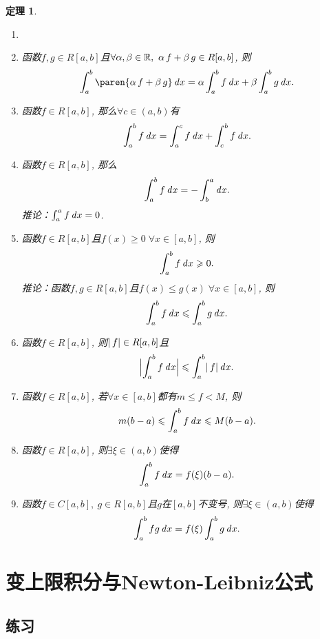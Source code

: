 \documentclass[a4paper,punct=CCT]{ctexbook}
\theoremstyle{break}
\newtheorem*{theorem*}{定理}
\newif\ifshowex
\let\leq\leqslant
\let\le\leq
\let\geq\geqslant
\let\ge\geq}
\begin{document}
\begin{theorem*}
  \begin{enumerate}
  \item[]
  \item 函数\(f, g \in R[a,b]\)且\(\forall \alpha, \beta \in \mathbb{R},\ \alpha\,f + \beta\,g \in R[a,b]\), 则
    \[
      \int_a^b \paren{\alpha\,f + \beta\,g} \dx
      = \alpha \int_a^b f \dx + \beta \int_a^b g \dx.
    \]

  \item 函数\(f \in R[a,b]\), 那么\(\forall c \in (a,b)\)有
    \[
      \int_a^b f \mathop{}\!\mathit{d} x = \int_a^c f \mathop{}\!\mathit{d} x + \int_c^b f \mathop{}\!\mathit{d} x.
    \]

  \item 函数\(f \in R[a,b]\), 那么
    \[
      \int_a^b f \mathop{}\!\mathit{d} x = - \int_b^a \mathop{}\!\mathit{d} x.
    \]
    推论：\(\int_a^a f \mathop{}\!\mathit{d} x = 0\).

  \item 函数\(f \in R[a,b]\)且\(f(x) \ge 0\; \forall x \in [a,b]\), 则
    \[
      \int_a^b f \dx \ge 0.
    \]
    推论：函数\(f, g \in R[a,b]\)且\(f(x) \le g(x)\; \forall x \in [a,b]\), 则
    \[
      \int_a^b f \dx \le \int_a^b g \dx.
    \]

  \item 函数\(f \in R[a,b]\), 则\(\lvert\,f\rvert \in R[a,b]\)且
    \[
      \abs[\Big]{\int_a^b f \dx} \le \int_a^b \abs{\,f} \dx.
    \]

  \item 函数\(f \in R[a,b]\), 若\(\forall x \in [a,b]\)都有\(m \le f < M\), 则
    \[
      m(b-a) \le \int_a^b f \dx \le M(b-a).
    \]

  \item 函数\(f \in R[a,b]\), 则\(\exists \xi \in (a,b)\)使得
    \[
      \int_a^b f \mathop{}\!\mathit{d} x = f(\xi)(b-a).
    \]

  \item 函数\(f \in C[a,b],\ g \in R[a,b]\)且\(g\)在\([a,b]\)不变号, 则\(\exists \xi \in (a,b)\)使得
    \[
      \int_a^b fg \mathop{}\!\mathit{d} x = f(\xi) \int_a^b g \mathop{}\!\mathit{d} x.
    \]
  \end{enumerate}
\end{theorem*}

\section{变上限积分与Newton-Leibniz公式}

\ifshowex
{}
\subsection*{练习}
\end{document}
